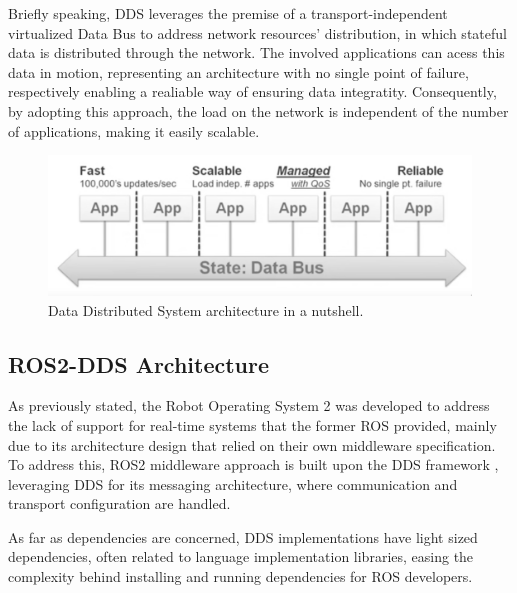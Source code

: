 Briefly speaking, DDS leverages the premise of a transport-independent virtualized Data Bus to address network resources' distribution, in which stateful data is distributed through the network. The involved applications can acess this data in motion, representing an architecture with no single point of failure, respectively enabling a realiable way of ensuring data integratity. Consequently, by adopting this approach, the load on the network is independent of the number of applications, making it easily scalable. %

\begin{figure}[H]
    \centering
    \includegraphics[width=0.5\linewidth]{images/dds-architecture.png}
    \caption{Data Distributed System architecture in a nutshell.}
    \label{fig:dds-architecture-nutshell}
\end{figure}


\subsection{ROS2-DDS Architecture}

As previously stated, the Robot Operating System 2 was developed to address the lack of support for real-time systems that the former ROS provided, mainly due to its architecture design that relied on their own middleware specification. To address this, ROS2 middleware approach is built upon the DDS framework \cite{maruyama2016exploring}, leveraging DDS for its messaging architecture, where communication and transport configuration are handled. %

As far as dependencies are concerned, DDS implementations have light sized dependencies, often related to language implementation libraries, easing the complexity behind installing and running dependencies for ROS developers. \cite{ros-on-dds}

